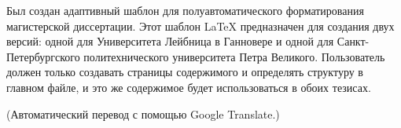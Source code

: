 Был создан адаптивный шаблон для полуавтоматического форматирования магистерской диссертации. Этот шаблон LaTeX предназначен для создания двух версий: одной для Университета Лейбница в Ганновере и одной для Санкт-Петербургского политехнического университета Петра Великого. Пользователь должен только создавать страницы содержимого и определять структуру в главном файле, и это же содержимое будет использоваться в обоих тезисах.

(Автоматический перевод с помощью Google Translate.)